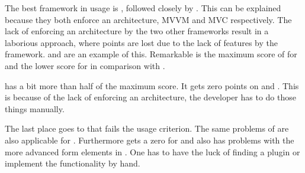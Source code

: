 \documentclass[a4paper]{artikel3}
\begin{document}
\begin{table}
\centering
{}
\caption{Overview of support.}
\label{tabel:evaluatie-ondersteuning-u}
\end{table}


The best framework in usage is \kendoa{}, followed closely by \sta{}.
This can be explained because they both enforce an architecture, MVVM and MVC respectively.
The lack of enforcing an architecture by the two other frameworks result in a laborious approach, where points are lost due to the lack of features by the framework.
 and  are an example of this.
Remarkable is the maximum score of \kendoa{} for  and the lower score for  in comparison with \sta.

\jqma{} has a bit more than half of the maximum score.
It gets zero points on  and .
This is because of the lack of enforcing an architecture, the developer has to do those things manually. 

The last place goes to \lungo{} that fails the usage criterion.
The same problems of \jqma{} are also applicable for \lungo{}.
Furthermore \lungo{} gets a zero for  and also has problems with the more advanced form elements in .
One has to have the luck of finding a plugin or implement the functionality by hand.
\end{document}
